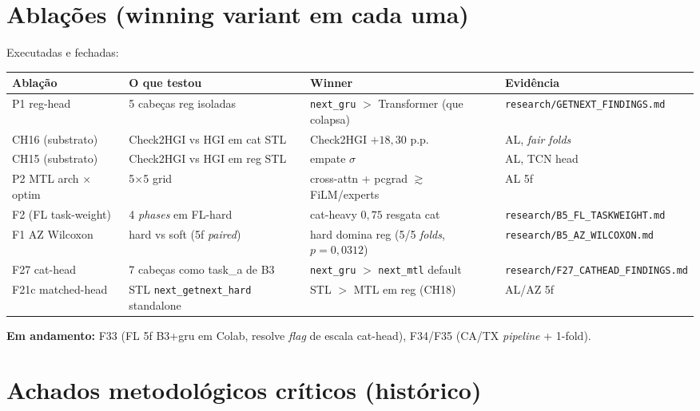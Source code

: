 \documentclass[11pt,a4paper]{article}
\begin{document}
\section{Ablações (winning variant em cada uma)}

\noindent Executadas e fechadas:

\begin{table}[H]
\centering
\footnotesize
\begin{tabular}{llll}
\toprule
\textbf{Ablação} & \textbf{O que testou} & \textbf{Winner} & \textbf{Evidência} \\
\midrule
P1 reg-head & 5 cabeças reg isoladas & \texttt{next\_gru} $>$ Transformer (que colapsa) & \texttt{research/GETNEXT\_FINDINGS.md} \\
CH16 (substrato) & Check2HGI vs HGI em cat STL & Check2HGI $+18{,}30$ p.p.\ & AL, \textit{fair folds} \\
CH15 (substrato) & Check2HGI vs HGI em reg STL & empate $\sigma$ & AL, TCN head \\
P2 MTL arch $\times$ optim & 5$\times$5 grid & cross-attn + pcgrad $\gtrsim$ FiLM/experts & AL 5f \\
F2 (FL task-weight) & 4 \textit{phases} em FL-hard & cat-heavy $0{,}75$ resgata cat & \texttt{research/B5\_FL\_TASKWEIGHT.md} \\
F1 AZ Wilcoxon & hard vs soft (5f \textit{paired}) & hard domina reg (5/5 \textit{folds}, $p=0{,}0312$) & \texttt{research/B5\_AZ\_WILCOXON.md} \\
F27 cat-head & 7 cabeças como task\_a de B3 & \texttt{next\_gru} $>$ \texttt{next\_mtl} default & \texttt{research/F27\_CATHEAD\_FINDINGS.md} \\
F21c matched-head & STL \texttt{next\_getnext\_hard} standalone & STL $>$ MTL em reg (CH18) & AL/AZ 5f \\
\bottomrule
\end{tabular}
\end{table}

\noindent \textbf{Em andamento:} F33 (FL 5f B3+gru em Colab, resolve \textit{flag} de escala cat-head), F34/F35 (CA/TX \textit{pipeline} + 1-fold).

\section{Achados metodológicos críticos (histórico)}
\end{document}
